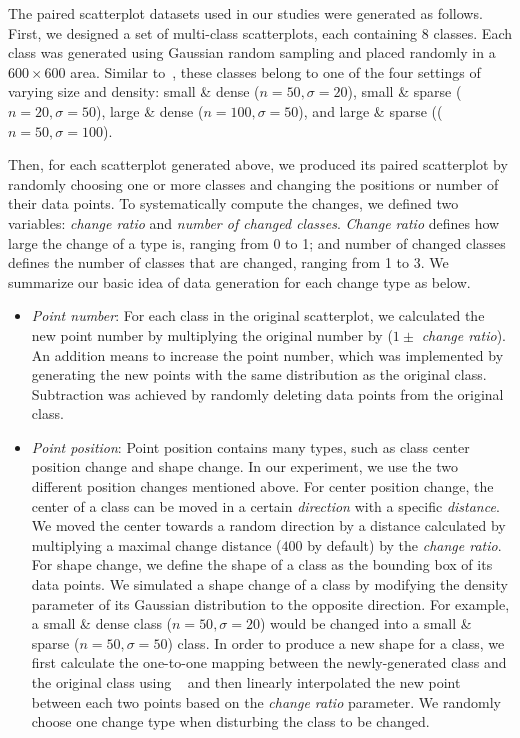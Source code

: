 \vspace{.3em}
The paired scatterplot datasets used in our studies were generated as follows.
First, we designed a set of multi-class scatterplots, each containing $8$ classes. Each class was generated using Gaussian random sampling and placed randomly in a $600 \times 600$ area.
Similar to~\cite{Lu21}, these classes belong to one of the four settings of varying size and density: small \& dense ($n=50, \sigma=20$), small \& sparse ($n=20, \sigma=50$),  large \& dense ($n=100, \sigma=50$), and large \& sparse (($n=50, \sigma=100$).

Then, for each scatterplot generated above, we produced its paired scatterplot by randomly choosing one or more classes and changing the positions or number of their data points. 
To systematically compute the changes, we defined two variables: \emph{change ratio} and \emph{number of changed classes}.
\emph{Change ratio} defines how large the change of a type is, ranging from 0 to 1; and {number of changed classes} defines the number of classes that are changed, ranging from 1 to 3. We summarize our basic idea of data generation for each change type as below.
\begin{itemize}

     \item \emph{Point number}: For each class in the original scatterplot,  we calculated the new point number by multiplying the original number by ($1 \pm$ \emph{change ratio}). An addition means to increase the point number, which was implemented by generating the new points with the same distribution as the original class. Subtraction was achieved by randomly deleting data points from the original class.

     \item \emph{Point position}: Point position contains many types, such as class center position change and shape change. In our experiment, we use the two different position changes mentioned above. For center position change, the center of a class can be moved in a certain \emph{direction} with a specific \emph{distance}. We moved the center towards a random direction by a distance calculated by multiplying a maximal change distance ($400$ by default) by the \emph{change ratio}. For shape change, we define the shape of a class as the bounding box of its data points. We simulated a shape change of a class by modifying the density parameter of its Gaussian distribution to the opposite direction. For example, a small \& dense class ($n=50, \sigma=20$) would be changed into a small \& sparse ($n=50, \sigma=50$) class. In order to produce a new shape for a class, we first calculate the one-to-one mapping between the newly-generated class and the original class using ~\cite{kuhn1955hungarian} and then linearly interpolated the new point between each two points based on the \emph{change ratio} parameter. We randomly choose one change type when disturbing the class to be changed.
\end{itemize}
